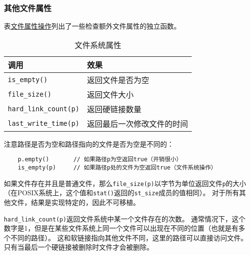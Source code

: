 \subsubsection{其他文件属性}
表\hyperref[t20.11]{文件属性操作}列出了一些检查额外文件属性的独立函数。
\begin{table}[ht]
    \centering
    \begin{tabular}{l|l}
        \hline
        \textbf{调用}                   & \textbf{效果}   \\
        \hline
        \texttt{is\_empty()}          & 返回文件是否为空      \\
        \texttt{file\_size()}         & 返回文件大小        \\
        \texttt{hard\_link\_count(p)} & 返回硬链接数量       \\
        \texttt{last\_write\_time(p)} & 返回最后一次修改文件的时间 \\
        \hline
    \end{tabular}
    \caption{文件系统属性}
    \label{t20.11}
\end{table}

注意路径是否为空和路径指向的文件是否为空是不同的：
\begin{lstlisting}
    p.empty()       // 如果路径p为空返回true（开销很小）
    is_empty(p)     // 如果路径p处的文件为空返回true（文件系统操作）
\end{lstlisting}
如果文件存在并且是普通文件，那么\texttt{file\_size(p)}以字节为单位返回文件\texttt{p}的大小
（在POSIX系统上，这个值和\texttt{stat()}返回的\texttt{st\_size}成员的值相同）。
对于所有其他文件，结果是实现特定的，因此不可移植。

\texttt{hard\_link\_count(p)}返回文件系统中某一个文件存在的次数。
通常情况下，这个数字是1，但是在某些文件系统上同一个文件可以出现在不同的位置（也就是有多个不同的路径）。
这和软链接指向其他文件不同，这里的路径可以直接访问文件。只有当最后一个硬链接被删除时文件才会被删除。

